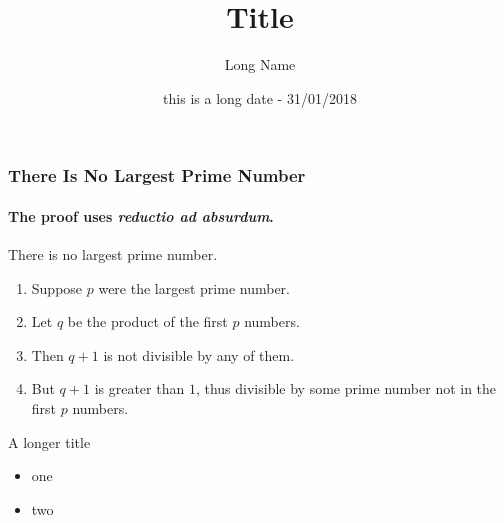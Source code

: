 \documentclass[sans, aspectratio=169]{beamer}
\title{Title}
\date[small date]{this is a long date - 31/01/2018}
\author[S. Name]{Long Name}
\begin{document}
\begin{frame}
\titlepage
\end{frame}


\begin{frame} 
\frametitle{There Is No Largest Prime Number} 
\framesubtitle{The proof uses \textit{reductio ad absurdum}.} 
\begin{theorem}
There is no largest prime number. \end{theorem} 
\begin{enumerate} 
\item<1-| alert@1> Suppose $p$ were the largest prime number. 
\item<2-> Let $q$ be the product of the first $p$ numbers. 
\item<3-> Then $q+1$ is not divisible by any of them. 
\item<1-> But $q + 1$ is greater than $1$, thus divisible by some prime
number not in the first $p$ numbers.
\end{enumerate}
\end{frame}

\begin{frame}{A longer title}
\begin{itemize}
\item one
\item two
\end{itemize}
\end{frame}
\end{document}
